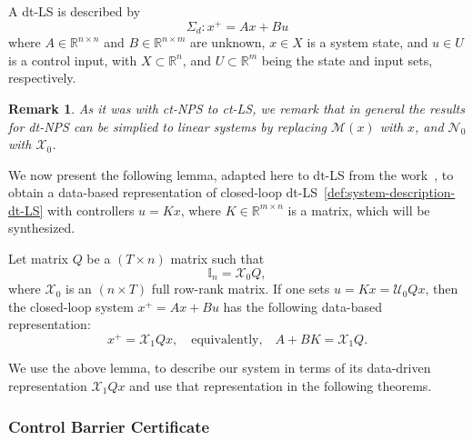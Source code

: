 \documentclass[sigconf]{acmart}
\newtheorem{remark}{Remark}
\newcommand{\identity}{\mathbb{I}}
\begin{document}
\begin{definition}
\label{def:system-description-dt-LS}
A dt-LS is described by
\begin{equation}
\label{eq:dt-LS}
\Sigma_d: x^+ = Ax+Bu
\end{equation}
where $A\in\mathbb{R}^{n\times n}$ and $B\in\mathbb{R}^{n\times m}$ are unknown, $x\in X$ is a system state, and $u\in U$ is a control input, with $X\subset\mathbb{R}^n$, and $U\subset\mathbb{R}^m$ being the state and input sets, respectively.
\end{definition}

\begin{remark}
As it was with ct-NPS to ct-LS, we remark that in general the results for dt-NPS can be simplied to linear systems by replacing $\mathcal{M}(x)$ with $x$, and $\mathcal{N}_{0}$ with $\mathcal{X}_{0}$.
\end{remark}

We now present the following lemma, adapted here to dt-LS from the work~\cite{de2019formulas}, to obtain a data-based representation of closed-loop dt-LS~\eqref{def:system-description-dt-LS} with controllers $u=Kx$, where $K\in\mathbb{R}^{m\times n}$ is a matrix, which will be synthesized.

\begin{lemma}
\label{lem:Q-dtLS}
Let matrix $Q$ be a $(T\times n)$ matrix such that
\begin{equation}
\label{eq:Q-matrix-dtLS}
\identity_n = \mathcal{X}_{0}Q,
\end{equation}
where $\mathcal{X}_{0}$ is an $(n\times T)$ full row-rank matrix.
If one sets $u=Kx = \mathcal{U}_{0}Qx$, then the closed-loop system $x^+=Ax+Bu$ has the following data-based representation:
\begin{equation}
\label{eq:A+BK=X1TQ-dtLS}
x^+ = \mathcal{X}_{1}Qx,\quad\text{equivalently,}\quad A+BK = \mathcal{X}_{1}Q.
\end{equation}
\end{lemma}

We use the above lemma, to describe our system in terms of its data-driven representation $\mathcal{X}_{1}Qx$ and use that representation in the following theorems.

\subsubsection{Control Barrier Certificate}
\end{document}
